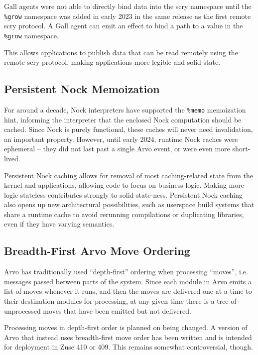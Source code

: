 \documentclass[twoside]{article}
\begin{document}
Gall agents were not able to directly bind data into the scry namespace until the \lstinline[style=inlinecode]{%grow} namespace was added in early 2023 in the same release as the first remote scry protocol.  A Gall agent can emit an effect to bind a path  to a value in the \lstinline[style=inlinecode]{%grow} namespace.  

This allows applications to publish data that can be read remotely using the remote scry protocol, making applications more legible and solid-state.

\subsection{Persistent Nock Memoization}

For around a decade, Nock interpreters have supported the \lstinline[style=inlinecode]{%memo} memoization hint, informing the interpreter that the enclosed Nock computation should be cached.  Since Nock is purely functional, these caches will never need invalidation, an important property.  However, until early 2024, runtime Nock caches were ephemeral – they did not last past a single Arvo event, or were even more short-lived.

Persistent Nock caching allows for removal of most caching-related state from the kernel and applications, allowing code to focus on business logic.  Making more logic stateless contributes strongly to solid-state-ness.  Persistent Nock caching also opens up new architectural possibilities, such as userspace build systems that share a runtime cache to avoid rerunning compilations or duplicating libraries, even if they have varying semantics.

\subsection{Breadth-First Arvo Move Ordering}

Arvo has traditionally used ``depth-first'' ordering when processing ``moves'', i.e. messages passed between parts of the system.  Since each module in Arvo emits a list of moves whenever it runs, and then the moves are delivered one at a time to their destination modules for processing, at any given time there is a tree of unprocessed moves that have been emitted but not delivered.

Processing moves in depth-first order is planned on being changed.  A version of Arvo that instead uses breadth-first move order has been written and is intended for deployment in Zuse 410 or 409.  This remains somewhat controversial, though.
\end{document}

